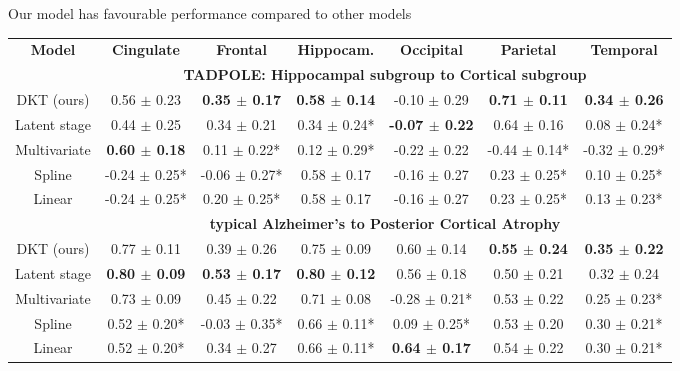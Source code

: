 \documentclass[portrait,a0,final,20pt]{a0poster}
\newcommand{\fnt}[1]{\LARGE{#1}}
\begin{document}
{\begin{multicols}{2}
\begin{table}[H]
\centering
\fnt{Our model has favourable performance compared to other models}\\
\vspace{1em}
\fontsize{27}{30}\selectfont
\begin{tabular}{c | c c c c c c}
\textbf{Model} & \textbf{Cingulate} & \textbf{Frontal} & \textbf{Hippocam.} & \textbf{Occipital} & \textbf{Parietal} & \textbf{Temporal}\\
& \multicolumn{6}{c}{\textbf{TADPOLE: Hippocampal subgroup to Cortical subgroup}}\\
DKT (ours) &      0.56 $\pm$ 0.23 &    \textbf{0.35 $\pm$ 0.17} &        \textbf{0.58 $\pm$ 0.14} &     -0.10 $\pm$ 0.29 &     \textbf{0.71 $\pm$ 0.11} &     \textbf{0.34 $\pm$ 0.26} \\
Latent stage &      0.44 $\pm$ 0.25 &    0.34 $\pm$ 0.21 &       0.34 $\pm$ 0.24* &     \textbf{-0.07 $\pm$ 0.22} &     0.64 $\pm$ 0.16 &    0.08 $\pm$ 0.24* \\
Multivariate &      \textbf{0.60 $\pm$ 0.18} &   0.11 $\pm$ 0.22* &       0.12 $\pm$ 0.29* &     -0.22 $\pm$ 0.22 &   -0.44 $\pm$ 0.14* &   -0.32 $\pm$ 0.29* \\
Spline &    -0.24 $\pm$ 0.25* &  -0.06 $\pm$ 0.27* &        0.58 $\pm$ 0.17 &     -0.16 $\pm$ 0.27 &    0.23 $\pm$ 0.25* &    0.10 $\pm$ 0.25* \\
Linear &    -0.24 $\pm$ 0.25* &   0.20 $\pm$ 0.25* &        0.58 $\pm$ 0.17 &     -0.16 $\pm$ 0.27 &    0.23 $\pm$ 0.25* &    0.13 $\pm$ 0.23* \\
& \multicolumn{6}{c}{\textbf{typical Alzheimer's to Posterior Cortical Atrophy}}\\
DKT (ours) &    0.77 $\pm$ 0.11 &    0.39 $\pm$ 0.26 &      0.75 $\pm$ 0.09 &    0.60 $\pm$ 0.14 &    \textbf{0.55 $\pm$ 0.24} &    \textbf{0.35 $\pm$ 0.22} \\
Latent stage &    \textbf{0.80 $\pm$ 0.09} &    \textbf{0.53 $\pm$ 0.17} &      \textbf{0.80 $\pm$ 0.12} &    0.56 $\pm$ 0.18 &    0.50 $\pm$ 0.21 &    0.32 $\pm$ 0.24 \\
Multivariate &   0.73 $\pm$ 0.09 &   0.45 $\pm$ 0.22  &    0.71 $\pm$ 0.08 & -0.28 $\pm$ 0.21* &  0.53 $\pm$ 0.22  &  0.25 $\pm$ 0.23* \\
Spline &   0.52 $\pm$ 0.20* &  -0.03 $\pm$ 0.35* &     0.66 $\pm$ 0.11* &   0.09 $\pm$ 0.25* &    0.53 $\pm$ 0.20 &   0.30 $\pm$ 0.21* \\
Linear &   0.52 $\pm$ 0.20* &    0.34 $\pm$ 0.27 &     0.66 $\pm$ 0.11* &    \textbf{0.64 $\pm$ 0.17} &    0.54 $\pm$ 0.22 &   0.30 $\pm$ 0.21* \\
\end{tabular}
\vspace{0.5em}
\label{sec:dktPerfMetrics}
\end{table}



\end{multicols}}
\end{document}
